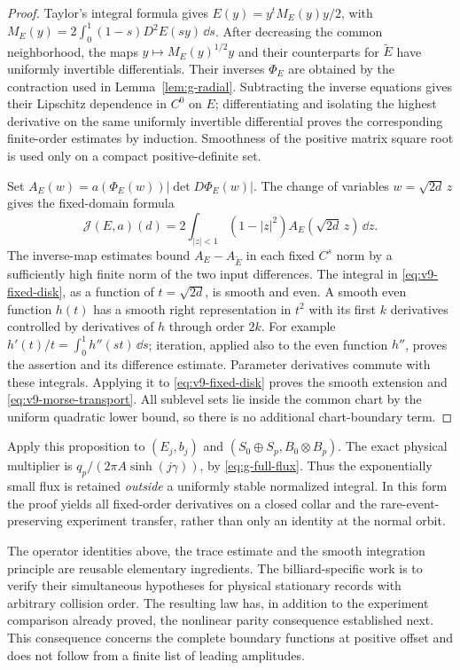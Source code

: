 \begin{proof}
Taylor's integral formula gives $E(y)=y^tM_E(y)y/2$, with
$M_E(y)=2\int_0^1(1-s)D^2E(sy)\,\dd s$.
After decreasing the common neighborhood, the maps
$y\mapsto M_E(y)^{1/2}y$ and their counterparts for $\widetilde E$
have uniformly invertible differentials. Their inverses $\Phi_E$
are obtained by the contraction used in Lemma~\ref{lem:g-radial}.
Subtracting the inverse equations gives their Lipschitz dependence
in $C^0$ on $E$; differentiating and isolating the highest derivative
on the same uniformly invertible differential proves the corresponding
finite-order estimates by induction. Smoothness of the positive matrix
square root is used only on a compact positive-definite set.

Set $A_E(w)=a(\Phi_E(w))|\det D\Phi_E(w)|$. The change of variables
$w=\sqrt{2d}\,z$ gives the fixed-domain formula
\begin{equation}\label{eq:v9-fixed-disk}
 \mathcal J(E,a)(d)=
          2\int_{|z|<1}(1-|z|^2)A_E(\sqrt{2d}\,z)\,\dd z.
\end{equation}
The inverse-map estimates bound $A_E-A_{\widetilde E}$ in each fixed
$C^s$ norm by a sufficiently high finite norm of the two input
differences. The integral in \eqref{eq:v9-fixed-disk}, as a function
of $t=\sqrt{2d}$, is smooth and even. A smooth even function $h(t)$
has a smooth right representation in $t^2$ with its first $k$
derivatives controlled by derivatives of $h$ through order $2k$.
For example $h'(t)/t=\int_0^1h''(st)\,\dd s$; iteration, applied
also to the even function $h''$, proves the assertion and its
difference estimate. Parameter derivatives commute with these
integrals. Applying it to \eqref{eq:v9-fixed-disk} proves the smooth
extension and \eqref{eq:v9-morse-transport}. All sublevel sets lie
inside the common chart by the uniform quadratic lower bound, so
there is no additional chart-boundary term.
\end{proof}

Apply this proposition to $(E_j,b_j)$ and
$(S_0\oplus S_p,B_0\otimes B_p)$. The exact physical multiplier is
$q_p/(2\pi A\sinh(j\gamma))$, by
\eqref{eq:g-full-flux}. Thus the exponentially small flux is retained
\emph{outside} a uniformly stable normalized integral. In this form
the proof yields all fixed-order derivatives on a closed collar and
the rare-event-preserving experiment transfer, rather than only an
identity at the normal orbit.

The operator identities above, the trace estimate and the smooth
integration principle are reusable elementary ingredients. The
billiard-specific work is to verify their simultaneous hypotheses for
physical stationary records with arbitrary collision order. The
resulting law has, in addition to the experiment comparison already
proved, the nonlinear parity consequence established next. This
consequence concerns the complete boundary functions at positive
offset and does not follow from a finite list of leading amplitudes.
